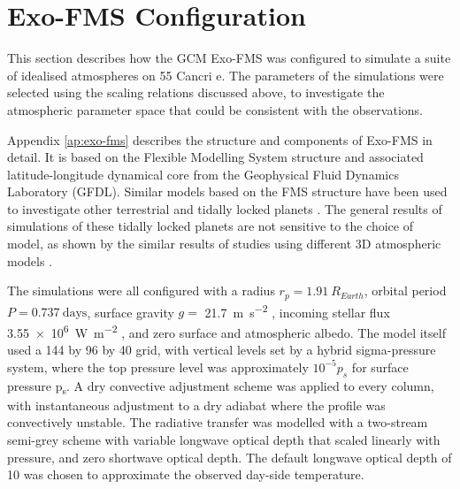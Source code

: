 \section{Exo-FMS Configuration}\label{sec:sim-lava-planet}

This section describes how the GCM Exo-FMS was configured to simulate a suite of idealised atmospheres on 55 Cancri e. The parameters of the simulations were selected using the scaling relations discussed above, to investigate the atmospheric parameter space that could be consistent with the observations.


Appendix \ref{ap:exo-fms} describes the structure and components of Exo-FMS in detail. It is based on the Flexible Modelling System structure and associated latitude-longitude dynamical core from the Geophysical Fluid Dynamics Laboratory (GFDL). Similar models based on the FMS structure have been used to investigate other terrestrial and tidally locked planets \citep{merlis2010atmospheric, heng2011atmospheric, koll2015phasecurves, koll2016temperature}. The general results of simulations of these tidally locked planets are not sensitive to the choice of model, as shown by the similar results of studies using different 3D atmospheric models \citep{carone2014connecting, kataria2014atmospheric, charnay20153d}.

The simulations were all configured with a radius $r_{p} = 1.91\ R_{Earth}$, orbital period $P = 0.737\ \mathrm{days}$, surface gravity $g =$ \SI{21.7}{\metre\per\second\squared} \citep{demory201655cnce}, incoming stellar flux \SI[scientific-notation=true]{3.55e6}{\watt\per\metre\squared} \citep{von201155}, and zero surface and atmospheric albedo. The model itself used a 144 by 96 by 40 grid, with vertical levels set by a hybrid sigma-pressure system, where the top pressure level was approximately $10^{-5}p_{s}$ for surface pressure p\textsubscript{s}. A dry convective adjustment scheme was applied to every column, with instantaneous adjustment to a dry adiabat where the profile was convectively unstable. The radiative transfer was modelled with a two-stream semi-grey scheme with variable longwave optical depth that scaled linearly with pressure, and zero shortwave optical depth. The default longwave optical depth of 10 was chosen to approximate the observed day-side temperature.


